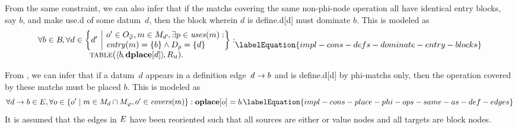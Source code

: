 From the same \gls{constraint}, we can also infer that if the \glspl{match}
covering the same non-\gls{phi-node} \gls{operation} all have identical
\glspl{entry block}, say $b$\hspace{-1pt}, and make \gls{use.d} of some
\gls{datum}~$d$\hspace{-1pt}, then the \gls{block} wherein $d$ is
\gls{define.d}[d] must dominate $b$\hspace{-1pt}.
%
This is modeled as
%
\begin{equation}
  \begin{array}{@{}c@{}}
    \forall b \in \mBlockSet \hspace{-1pt},
    \forall d \in
      \mSetBuilder*{d'}%
                   {%
                     \begin{array}{@{}l@{}}
                       o' \in \mOpCompSet{\mPhi},
                       m \in \mMatchSet[d'] \hspace{-1pt},
                       \exists p \in \mUses(m) : \\
                       \mEntry(m) = \mSet{b} \mAnd \mDataSet[p] = \mSet{d}
                     \end{array}
                   } : \\
    \mTable(
      \mTuple{b \hspace{-1pt}, \mVar{dplace}[d]} \hspace{-1pt},
      \mDomMatrix
    ).
  \end{array}
  \labelEquation{impl-cons-defs-dominate-entry-blocks}
\end{equation}

From , we can infer that if a \gls{datum}~$d$ appears in
a \gls{definition edge}~$d \rightarrow b$ and is \gls{define.d}[d] by
\glspl{phi-match} only, then the \gls{operation} covered by these \glspl{match}
must be placed $b$\hspace{-1pt}.
%
This is modeled as
%
\begin{equation}
  \forall \mEdge{d}{b} \in \mFunctionDefEdgeSet,
  \forall o \in
    \mSetBuilder{o'}%
                {%
                  \begin{array}{@{}l@{}}
                    m \in \mMatchSet[d] \cap \mPhiMatchSet,
                    o' \in \mCovers(m)
                  \end{array}
                } :
  \mVar{oplace}[o] = b \hspace{-1pt}.
  \labelEquation{impl-cons-place-phi-ops-same-as-def-edges}
\end{equation}
%
It is assumed that the \glspl{edge} in $E$ have been
reoriented such that all \glspl{source} are either  or
\glspl{value node} and all \glspl{target} are \glspl{block node}.


